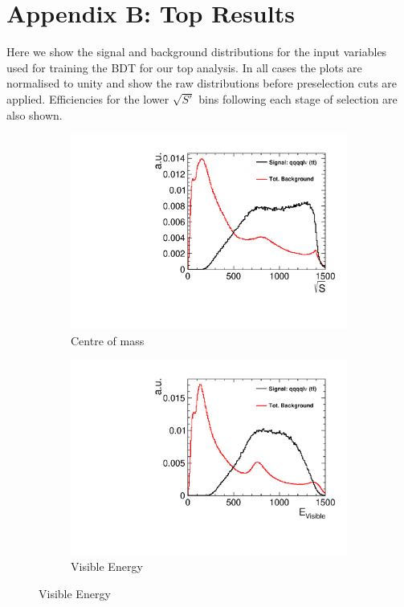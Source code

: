 \section{Appendix B: Top Results}
\label{appendixB}

Here we show the signal and background distributions for the input variables used for training the BDT for our top analysis. In all cases the plots are normalised to unity and show the raw distributions before preselection cuts are applied. Efficiencies for the lower $\sqrt{S'}$ bins following each stage of selection are also shown. 


\begin{figure}[] 
  \begin{subfigure}[b]{0.5\linewidth}
    \centering
    \includegraphics[width=0.75\linewidth]{TopAnalysis/figures/BDTVariables/EnergyConstraintAlt} 
    \caption{Centre of mass} 
    \vspace{4ex}
  \end{subfigure}%
  \begin{subfigure}[b]{0.5\linewidth}
    \centering
    \includegraphics[width=0.75\linewidth]{TopAnalysis/figures/BDTVariables/VisibleEnergy} 
    \caption{Visible Energy} 
    \vspace{4ex}
  \end{subfigure} 
\end{figure}

